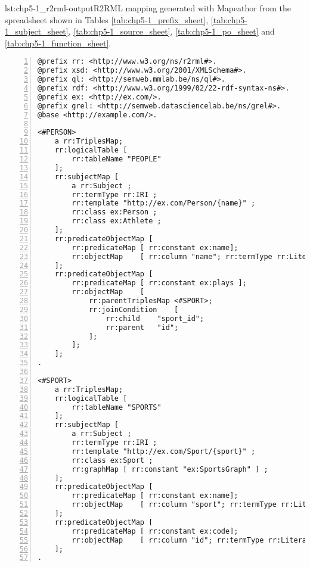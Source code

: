 \begin{captionedlisting}{lst:chp5-1_r2rml-output}{R2RML mapping generated with Mapeathor from the spreadsheet shown in Tables \ref{tab:chp5-1_prefix_sheet}, \ref{tab:chp5-1_subject_sheet}, \ref{tab:chp5-1_source_sheet}, \ref{tab:chp5-1_po_sheet} and \ref{tab:chp5-1_function_sheet}. }
\centering
{\begin{lstlisting}[numbers=left,basicstyle=\ttfamily\small,columns=flexible]
@prefix rr: <http://www.w3.org/ns/r2rml#>.
@prefix xsd: <http://www.w3.org/2001/XMLSchema#>.
@prefix ql: <http://semweb.mmlab.be/ns/ql#>.
@prefix rdf: <http://www.w3.org/1999/02/22-rdf-syntax-ns#>.
@prefix ex: <http://ex.com/>.
@prefix grel: <http://semweb.datasciencelab.be/ns/grel#>.
@base <http://example.com/>.

<#PERSON>
    a rr:TriplesMap;
    rr:logicalTable [
    	rr:tableName "PEOPLE"
    ];
    rr:subjectMap [
    	a rr:Subject ;
    	rr:termType rr:IRI ;
    	rr:template "http://ex.com/Person/{name}" ;
    	rr:class ex:Person ;
    	rr:class ex:Athlete ;
    ];
    rr:predicateObjectMap [
    	rr:predicateMap	[ rr:constant ex:name];
    	rr:objectMap	[ rr:column "name"; rr:termType rr:Literal; rr:datatype xsd:string; rr:language "en" ]
    ];
    rr:predicateObjectMap [
        rr:predicateMap	[ rr:constant ex:plays ];
        rr:objectMap 	[
            rr:parentTriplesMap <#SPORT>;
            rr:joinCondition	[
                rr:child	"sport_id";
                rr:parent	"id";
            ];
        ];
    ];
.

<#SPORT>
    a rr:TriplesMap;
    rr:logicalTable [
    	rr:tableName "SPORTS"
    ];
    rr:subjectMap [
    	a rr:Subject ;
    	rr:termType rr:IRI ;
    	rr:template "http://ex.com/Sport/{sport}" ;
    	rr:class ex:Sport ;
    	rr:graphMap [ rr:constant "ex:SportsGraph" ] ;
    ];
    rr:predicateObjectMap [
    	rr:predicateMap	[ rr:constant ex:name];
    	rr:objectMap	[ rr:column "sport"; rr:termType rr:Literal; rr:datatype xsd:string; rr:language "en" ]
    ];
    rr:predicateObjectMap [
    	rr:predicateMap	[ rr:constant ex:code];
    	rr:objectMap	[ rr:column "id"; rr:termType rr:Literal; rr:datatype xsd:integer ]
    ];
.
\end{lstlisting}}
\end{captionedlisting}



